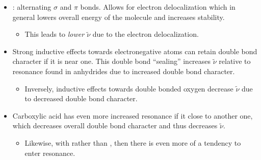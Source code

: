 \begin{itemize}
  \item {}: alternating \(\sigma \) and \(\pi \) bonds. Allows for electron delocalization which in general lowers overall energy of the molecule and increases stability.
    \begin{itemize}
      \item This leads to \emph{lower \(\tilde{\nu} \)} due to the electron delocalization.
    \end{itemize}
  \item Strong inductive effects towards electronegative atoms can retain double bond character if it is near one. This double bond ``sealing'' increases \(\tilde{\nu} \) relative to resonance found in anhydrides due to increased double bond character.
    \begin{itemize}
      \item Inversely, inductive effects towards double bonded oxygen decrease \(\tilde{\nu} \) due to decreased double bond character.
    \end{itemize}
  \item Carboxylic acid has even more increased resonance if it close to another one, which decreases overall double bond character and thus decreases \(\tilde{\nu} \). 
    \begin{itemize}
      \item Likewise, with  rather than , then there is even more of a tendency to enter resonance.
    \end{itemize}
\end{itemize}
  
